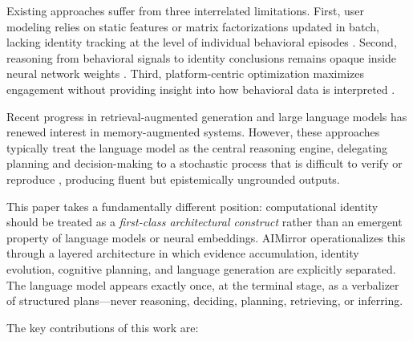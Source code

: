 \documentclass[conference]{IEEEtran}
\begin{document}
Existing approaches suffer from three interrelated limitations. First, user modeling relies on static features or matrix factorizations updated in batch, lacking identity tracking at the level of individual behavioral episodes \cite{koren2009}. Second, reasoning from behavioral signals to identity conclusions remains opaque inside neural network weights \cite{lipton2016}. Third, platform-centric optimization maximizes engagement without providing insight into how behavioral data is interpreted \cite{resnick1997}.

Recent progress in retrieval-augmented generation \cite{lewis2020} and large language models has renewed interest in memory-augmented systems. However, these approaches typically treat the language model as the central reasoning engine, delegating planning and decision-making to a stochastic process that is difficult to verify or reproduce \cite{ji2023}, producing fluent but epistemically ungrounded outputs.

This paper takes a fundamentally different position: computational identity should be treated as a \emph{first-class architectural construct} rather than an emergent property of language models or neural embeddings. AIMirror operationalizes this through a layered architecture in which evidence accumulation, identity evolution, cognitive planning, and language generation are explicitly separated. The language model appears exactly once, at the terminal stage, as a verbalizer of structured plans---never reasoning, deciding, planning, retrieving, or inferring.

The key contributions of this work are:
\end{document}
